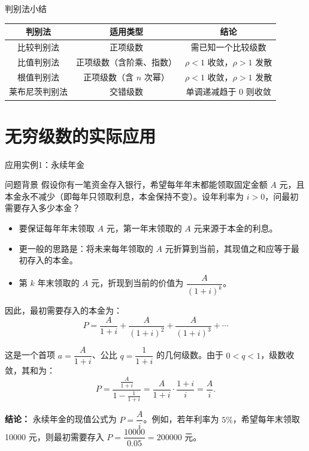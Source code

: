 \documentclass[aspectratio=169,10pt]{ctexbeamer}
\begin{document}
\begin{frame}{判别法小结}
	\normalsize
	\begin{tabular}{|c|c|c|}
		\hline
		\textbf{判别法} & \textbf{适用类型} & \textbf{结论} \\
		\hline
		比较判别法 & 正项级数 & 需已知一个比较级数 \\
		\hline
		比值判别法 & 正项级数（含阶乘、指数） & \(\rho < 1\) 收敛，\(\rho > 1\) 发散 \\
		\hline
		根值判别法 & 正项级数（含 \(n\) 次幂） & \(\rho < 1\) 收敛，\(\rho > 1\) 发散 \\
		\hline
		莱布尼茨判别法 & 交错级数 & 单调递减趋于 0 则收敛 \\
		\hline
	\end{tabular}
\end{frame}

\section{无穷级数的实际应用}

\begin{frame}{应用实例1：永续年金}
	\scriptsize
	\begin{block}{问题背景}
		假设你有一笔资金存入银行，希望每年年末都能领取固定金额 \(A\) 元，且本金永不减少（即每年只领取利息，本金保持不变）。设年利率为 \(i>0\)，问最初需要存入多少本金？
	\end{block}
	\pause
	
	\begin{itemize}
		\item 要保证每年年末领取 \(A\) 元，第一年末领取的 \(A\) 元来源于本金的利息。
		\item 更一般的思路是：将未来每年领取的 \(A\) 元折算到当前，其现值之和应等于最初存入的本金。
		\item 第 \(k\) 年末领取的 \(A\) 元，折现到当前的价值为 \(\dfrac{A}{(1+i)^k}\)。
	\end{itemize}
	
	因此，最初需要存入的本金为：
	\[
	P = \frac{A}{1+i} + \frac{A}{(1+i)^2} + \frac{A}{(1+i)^3} + \cdots
	\]
	
	这是一个首项 \(a=\dfrac{A}{1+i}\)、公比 \(q=\dfrac{1}{1+i}\) 的几何级数。由于 \(0<q<1\)，级数收敛，其和为：
	\[
	P=\frac{\frac{A}{1+i}}{1-\frac{1}{1+i}}
	=\frac{A}{1+i}\cdot\frac{1+i}{i}
	=\frac{A}{i}.
	\]
	
	\textbf{结论：} 永续年金的现值公式为 \(P=\dfrac{A}{i}\)。例如，若年利率为 \(5\%\)，希望每年末领取 10000 元，则最初需要存入 \(P=\dfrac{10000}{0.05}=200000\) 元。
	
\end{frame}
\end{document}
